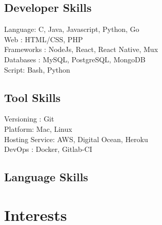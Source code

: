 \documentclass[a4paper]{deedy-resume} %
\begin{document}
\begin{minipage}[t]{0.49\textwidth}

\subsection{Developer Skills}

\textbullet{} Language: C, Java, Javascript, Python, Go \\
\textbullet{} Web : HTML/CSS, PHP \\
\textbullet{} Frameworks : NodeJs, React, React Native, Mux \\
\textbullet{} Databases : MySQL, PostgreSQL, MongoDB  \\
\textbullet{} Script: Bash, Python\\

\end{minipage}
\begin{minipage}[t]{0.49\textwidth}

\subsection{Tool Skills}

\textbullet{} Versioning : Git \\
\textbullet{} Platform: Mac, Linux \\
\textbullet{} Hosting Service: AWS, Digital Ocean, Heroku \\
\textbullet{} DevOps : Docker, Gitlab-CI \\

\end{minipage}
\begin{minipage}[t]{0.29\textwidth}

\insectionspace 

\subsection{Language Skills}


\end{minipage}

\sectionspace %
\sectionspace %



\section{Interests}
\end{document}
